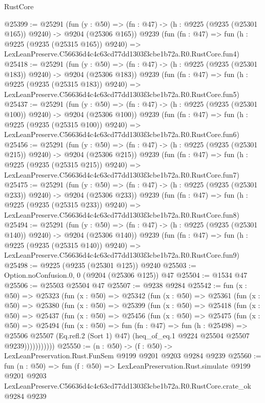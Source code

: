 \begin{lexlean}{RustCore}
\begin{coremodule}
@25399 := @25291
    (fun (y : @50) => (fn : @47) -> (h : @9225 (@9235 (@25301 @165)) @9240) -> @9204 (@25306 @165))
    @9239
    (fun (fn : @47) =>
    fun (h : @9225 (@9235 (@25315 @165)) @9240) =>
    LexLeanPreserve.C56636d4c4c63cd77dd1303f3cbe1b72a.R0.RustCore.fun4)
@25418 := @25291
    (fun (y : @50) => (fn : @47) -> (h : @9225 (@9235 (@25301 @183)) @9240) -> @9204 (@25306 @183))
    @9239
    (fun (fn : @47) =>
    fun (h : @9225 (@9235 (@25315 @183)) @9240) =>
    LexLeanPreserve.C56636d4c4c63cd77dd1303f3cbe1b72a.R0.RustCore.fun5)
@25437 := @25291
    (fun (y : @50) => (fn : @47) -> (h : @9225 (@9235 (@25301 @100)) @9240) -> @9204 (@25306 @100))
    @9239
    (fun (fn : @47) =>
    fun (h : @9225 (@9235 (@25315 @100)) @9240) =>
    LexLeanPreserve.C56636d4c4c63cd77dd1303f3cbe1b72a.R0.RustCore.fun6)
@25456 := @25291
    (fun (y : @50) => (fn : @47) -> (h : @9225 (@9235 (@25301 @215)) @9240) -> @9204 (@25306 @215))
    @9239
    (fun (fn : @47) =>
    fun (h : @9225 (@9235 (@25315 @215)) @9240) =>
    LexLeanPreserve.C56636d4c4c63cd77dd1303f3cbe1b72a.R0.RustCore.fun7)
@25475 := @25291
    (fun (y : @50) => (fn : @47) -> (h : @9225 (@9235 (@25301 @233)) @9240) -> @9204 (@25306 @233))
    @9239
    (fun (fn : @47) =>
    fun (h : @9225 (@9235 (@25315 @233)) @9240) =>
    LexLeanPreserve.C56636d4c4c63cd77dd1303f3cbe1b72a.R0.RustCore.fun8)
@25494 := @25291
    (fun (y : @50) => (fn : @47) -> (h : @9225 (@9235 (@25301 @140)) @9240) -> @9204 (@25306 @140))
    @9239
    (fun (fn : @47) =>
    fun (h : @9225 (@9235 (@25315 @140)) @9240) =>
    LexLeanPreserve.C56636d4c4c63cd77dd1303f3cbe1b72a.R0.RustCore.fun9)
@25498 := @9225 (@9235 (@25301 @125)) @9240
@25503 := Option.noConfusion.{0, 0} (@9204 (@25306 @125)) @47
@25504 := @1534 @47
@25506 := @25503 @25504 @47
@25507 := @9238 @9284
@25542 := fun (x : @50) =>
  @25323
    (fun (x : @50) =>
    @25342
      (fun (x : @50) =>
      @25361
        (fun (x : @50) =>
        @25380
          (fun (x : @50) =>
          @25399
            (fun (x : @50) =>
            @25418
              (fun (x : @50) =>
              @25437
                (fun (x : @50) =>
                @25456
                  (fun (x : @50) =>
                  @25475
                    (fun (x : @50) =>
                    @25494
                      (fun (x : @50) =>
                      fun (fn : @47) =>
                      fun (h : @25498) =>
                      @25506
                        @25507
                        (Eq.refl.{2} (Sort 1) @47)
                        (heq_of_eq.{1} @9224 @25504 @25507 @9239)))))))))))
@25550 := (n : @50) -> (f : @50) -> LexLeanPreservation.Rust.FunSem @9199 @9201 @9203 @9284 @9239
@25560 := fun (n : @50) =>
  fun (f : @50) =>
  LexLeanPreservation.Rust.simulate
    @9199
    @9201
    @9203
    LexLeanPreserve.C56636d4c4c63cd77dd1303f3cbe1b72a.R0.RustCore.crate_ok
    @9284
    @9239
\end{coremodule}
\end{lexlean}
